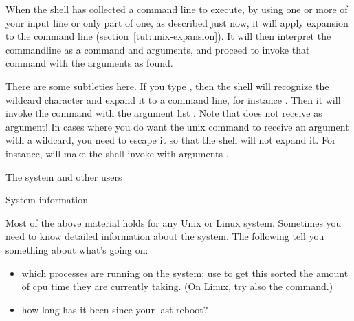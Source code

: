 When the shell has collected a command line to execute, by using one or
more of your input line or only part of one, as described just now, it
will apply expansion to the command line
(section~\ref{tut:unix-expansion}). It will then interpret the
commandline as a command and arguments, and proceed to invoke that
command with the arguments as found.

There are some subtleties here. If you type , then the shell
will recognize the wildcard character and expand it to a command line,
for instance . Then it will invoke the 
command with the argument list . Note that  does
not receive  as argument! In cases where you do want the unix
command to receive an argument with a wildcard, you need to escape it
so that the shell will not expand it. For instance,  will make the shell invoke  with arguments .

 {The system and other users}
\label{sec:users}

 {System information}

Most of the above material holds for any Unix or Linux system.
Sometimes you need to know detailed information about the system.
The following tell you something about what's going on:
\begin{itemize}
\item [\indexunix{top}] which processes are running on the system; use
   to get this sorted the amount of cpu time they are
  currently taking. (On Linux, try also the  command.)
\item [\indexunix{uptime}] how long has it been since your last reboot?
\end{itemize}

